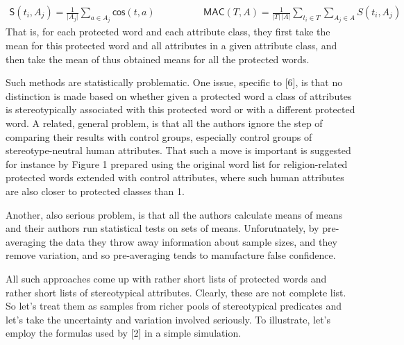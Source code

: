 \documentclass[12pt,dvipsnames,enabledeprecatedfontcommands]{scrartcl}
\begin{document}
\vspace{-2mm}

\footnotesize

\begin{align}
\mathsf{S}(t_i, A_j)  = \frac{1}{\vert A_j\vert}\sum_{a\in A_j}\mathsf{cos}(t,a) & \,\,\,\,\,\,\,\,\,\,\,\,\,\,\,\,\,\,\,\,\,\,\,\,\,
\mathsf{MAC}(T,A)  = \frac{1}{\vert T \vert \,\vert A\vert}\sum_{t_i \in T }\sum_{A_j \in A} S(t_i,A_j) \tag{MAC}
\end{align} \normalsize  \noindent That is, for each protected word and
each attribute class, they first take the mean for this protected word
and all attributes in a given attribute class, and then take the mean of
thus obtained means for all the protected words.

Such methods are statistically problematic. One issue, specific to
{[}6{]}, is that no distinction is made based on whether given a
protected word a class of attributes is stereotypically associated with
this protected word or with a different protected word. A related,
general problem, is that all the authors ignore the step of comparing
their results with control groups, especially control groups of
stereotype-neutral human attributes. That such a move is important is
suggested for instance by Figure 1 prepared using the original word list
for religion-related protected words extended with control attributes,
where such human attributes are also closer to protected classes than 1.

Another, also serious problem, is that all the authors calculate means
of means and their authors run statistical tests on sets of means.
Unforutnately, by pre-averaging the data they throw away information
about sample sizes, and they remove variation, and so pre-averaging
tends to manufacture false confidence.

All such approaches come up with rather short lists of protected words
and rather short lists of stereotypical attributes. Clearly, these are
not complete list. So let's treat them as samples from richer pools of
stereotypical predicates and let's take the uncertainty and variation
involved seriously. To illustrate, let's employ the formulas used by
{[}2{]} in a simple simulation.

\noindent
\end{document}
